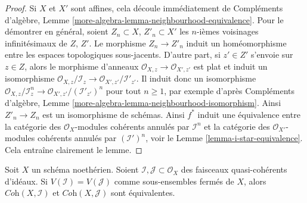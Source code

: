 \begin{proof}
Si $X$ et $X'$ sont affines, cela découle immédiatement de
Compléments d'algèbre, Lemme \ref{more-algebra-lemma-neighbourhood-equivalence}.
Pour le démontrer en général, soient $Z_n \subset X$, $Z'_n \subset X'$
les $n$-ièmes voisinages infinitésimaux de $Z$, $Z'$.
Le morphisme $Z_n \to Z'_n$ induit un homéomorphisme entre les
espaces topologiques sous-jacents. D'autre part, si $z' \in Z'$
s'envoie sur $z \in Z$, alors le morphisme d'anneaux
$\mathcal{O}_{X, z} \to \mathcal{O}_{X', z'}$ est plat
et induit un isomorphisme
$\mathcal{O}_{X, z}/\mathcal{I}_z \to \mathcal{O}_{X', z'}/\mathcal{I}'_{z'}$.
Il induit donc un isomorphisme
$\mathcal{O}_{X, z}/\mathcal{I}_z^n \to
\mathcal{O}_{X', z'}/(\mathcal{I}'_{z'})^n$
pour tout $n \geq 1$, par exemple d'après
Compléments d'algèbre, Lemme \ref{more-algebra-lemma-neighbourhood-isomorphism}.
Ainsi $Z'_n \to Z_n$ est un isomorphisme de schémas.
Ainsi $f^*$ induit une équivalence entre la
catégorie des $\mathcal{O}_X$-modules cohérents annulés par $\mathcal{I}^n$
et la
catégorie des $\mathcal{O}_{X'}$-modules cohérents annulés par
$(\mathcal{I}')^n$, voir le
Lemme \ref{lemma-i-star-equivalence}.
Cela entraîne clairement le lemme.
\end{proof}

\begin{lemma}
\label{lemma-inverse-systems-ideals-equivalence}
Soit $X$ un schéma noethérien. Soient
$\mathcal{I}, \mathcal{J} \subset \mathcal{O}_X$
des faisceaux quasi-cohérents d'idéaux.
Si $V(\mathcal{I}) = V(\mathcal{J})$ comme sous-ensembles fermés
de $X$, alors $\textit{Coh}(X, \mathcal{I})$ et $\textit{Coh}(X, \mathcal{J})$
sont équivalentes.
\end{lemma}

